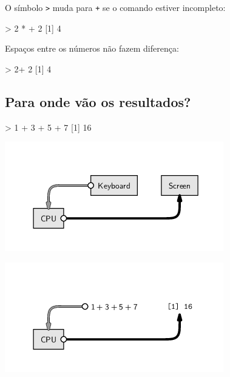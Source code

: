 \documentclass[
  10pt,
  a4paper]{book}
\newenvironment{Shaded}{\begin{snugshade}}{\end{snugshade}}
\newcommand{\DecValTok}[1]{\textcolor[rgb]{0.00,0.00,0.81}{#1}}
\newcommand{\NormalTok}[1]{#1}
\newcommand{\SpecialCharTok}[1]{\textcolor[rgb]{0.00,0.00,0.00}{#1}}
\begin{document}
O símbolo \texttt{\textgreater{}} muda para \texttt{+} se o comando estiver incompleto:

\begin{Shaded}
\begin{Highlighting}[]
\SpecialCharTok{\textgreater{}} \DecValTok{2} \SpecialCharTok{*}
\SpecialCharTok{+} \DecValTok{2}
\NormalTok{[}\DecValTok{1}\NormalTok{] }\DecValTok{4}
\end{Highlighting}
\end{Shaded}

Espaços entre os números não fazem diferença:

\begin{Shaded}
\begin{Highlighting}[]
\SpecialCharTok{\textgreater{}} \DecValTok{2}\SpecialCharTok{+}         \DecValTok{2}
\NormalTok{[}\DecValTok{1}\NormalTok{] }\DecValTok{4}
\end{Highlighting}
\end{Shaded}

\hypertarget{para-onde-vuxe3o-os-resultados}{%
\subsection{Para onde vão os resultados?}\label{para-onde-vuxe3o-os-resultados}}

\begin{Shaded}
\begin{Highlighting}[]
\SpecialCharTok{\textgreater{}} \DecValTok{1} \SpecialCharTok{+} \DecValTok{3} \SpecialCharTok{+} \DecValTok{5} \SpecialCharTok{+} \DecValTok{7}
\NormalTok{[}\DecValTok{1}\NormalTok{] }\DecValTok{16}
\end{Highlighting}
\end{Shaded}

\begin{center}\includegraphics[width=0.5\linewidth]{img/script-commandline} \end{center}

\begin{center}\includegraphics[width=0.5\linewidth]{img/script-commandlinedata} \end{center}
\end{document}
